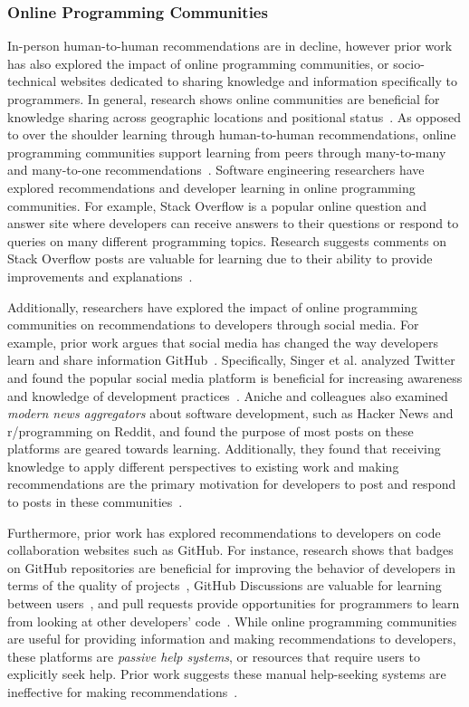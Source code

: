 \subsubsection{Online Programming Communities}

In-person human-to-human recommendations are in decline, however prior work has also explored the impact of online programming communities, or socio-technical websites dedicated to sharing knowledge and information specifically to programmers. In general, research shows online communities are beneficial for knowledge sharing across geographic locations and positional status~\cite{Hwang15online}. As opposed to over the shoulder learning through human-to-human recommendations, online programming communities support learning from peers through many-to-many and many-to-one recommendations~\cite{jensun17manyone}. Software engineering researchers have explored recommendations and developer learning in online programming communities. For example, Stack Overflow is a popular online question and answer site where developers can receive answers to their questions or respond to queries on many different programming topics. Research suggests comments on Stack Overflow posts are valuable for learning due to their ability to provide improvements and explanations~\cite{sengupta2020SOcomments}.

Additionally, researchers have explored the impact of online programming communities on recommendations to developers through social media. For example, prior work argues that social media has changed the way developers learn and share information GitHub~\cite{begel2010social}. Specifically, Singer et al. analyzed Twitter and found the popular social media platform is beneficial for increasing awareness and knowledge of development practices~\cite{singer2014twitter}. Aniche and colleagues also examined \textit{modern news aggregators} about software development, such as Hacker News and r/programming on Reddit, and found the purpose of most posts on these platforms are geared towards learning. Additionally, they found that receiving knowledge to apply different perspectives to existing work and making recommendations are the primary motivation for developers to post and respond to posts in these communities~\cite{Aniche18NewsAggregators}. 

Furthermore, prior work has explored recommendations to developers on code collaboration websites such as GitHub. For instance, research shows that badges on GitHub repositories are beneficial for improving the behavior of developers in terms of the quality of projects~\cite{dabbish2012social}, GitHub Discussions are valuable for learning between users~\cite{hata2021github}, and pull requests provide opportunities for programmers to learn from looking at other developers' code~\cite{Kalliamvakou15OSSCollaborative}. While online programming communities are useful for providing information and making recommendations to developers, these platforms are \textit{passive help systems}, or resources that require users to explicitly seek help. Prior work suggests these manual help-seeking systems are ineffective for making recommendations~\cite{Fischer1984ActiveHelpSystems}.

